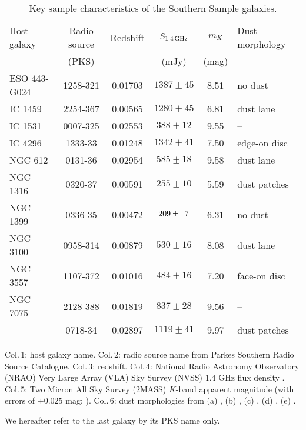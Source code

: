 \documentclass[fleqn,usenatbib,useAMS]{mnras}
\begin{document}
	\begin{table*}
		\centering
	\begin{threeparttable}
		\caption{Key sample characteristics of the Southern Sample galaxies.}
		\label{tab:sample}
		\begin{tabular}{l c c c c l}
			\hline
			\hline
			Host galaxy	& Radio source 	& Redshift	& $S_\text{1.4\,GHz}$	& $m_K$ & Dust morphology\\
						& (PKS) 		& 			& (mJy) 			& (mag)	&\\
			\hline 
			ESO 443-G024 & 1258-321 	& 0.01703	& $1387 \pm 45$		& 8.51 & no dust\tnote{a}	\\ 
			IC 1459 	& 2254-367 		& 0.00565 	& $1280 \pm 45$		& 6.81 & dust lane\tnote{b}	\\
			IC 1531 	& 0007-325 		& 0.02553 	& \leavevmode\phantom{0}$388 \pm 12$		& 9.55 & --					\\
			IC 4296		& 1333-\leavevmode\phantom{0}33 		& 0.01248 	& $1342 \pm 41$		& 7.50 & edge-on disc\tnote{b} \\
			NGC 612 	& 0131-\leavevmode\phantom{0}36 		& 0.02954 	& \leavevmode\phantom{0}$585 \pm 18$		& 9.58 & dust lane\tnote{c}	\\
			NGC 1316 	& 0320-\leavevmode\phantom{0}37 & 0.00591 	& \leavevmode\phantom{0}$255 \pm 10$		& 5.59 & dust patches\tnote{b} \\
			NGC 1399 	& 0336-\leavevmode\phantom{0}35 & 0.00472 	& \leavevmode\phantom{0}$209 \pm \leavevmode\phantom{0}7$	& 6.31 & no dust\tnote{b}	\\
			NGC 3100 	& 0958-314 		& 0.00879 	& \leavevmode\phantom{0}$530 \pm 16$		& 8.08 & dust lane\tnote{d}	\\
			NGC 3557 	& 1107-372 		& 0.01016 	& \leavevmode\phantom{0}$484 \pm 16$		& 7.20 & face-on disc\tnote{b}\\
			NGC 7075 	& 2128-388 		& 0.01819 	& \leavevmode\phantom{0}$837 \pm 28$		& 9.56 & --					\\
			--			& 0718-\leavevmode\phantom{0}34 		& 0.02897 	& $1119 \pm 41$		& 9.97 & dust patches\tnote{e} \\
			\hline
			\hline
		\end{tabular}
		\begin{tablenotes}
		\footnotesize
		\note Col.\,1: host galaxy name. Col.\,2: radio source name from Parkes Southern Radio Source Catalogue. Col.\,3: redshift. Col.\,4: National Radio Astronomy Observatory (NRAO) Very Large Array (VLA) Sky Survey (NVSS) 1.4 GHz flux density \citep{Condon1998}. Col.\,5: Two Micron All Sky Survey (2MASS) $K$-band apparent magnitude (with errors of $\pm 0.025$ mag; \citealt{Skrutskie2006}). Col.\,6: dust morphologies from (a) \citet{Govoni2000}, (b) \citet{Lauer2005}, (c) \citet{Bettoni2001}, (d) \citet{Sandage1979}, (e) \citet{Colbert2001}. 
		\item We hereafter refer to the last galaxy by its PKS name only.
		\end{tablenotes}
	\end{threeparttable}
	\end{table*}
\end{document}
